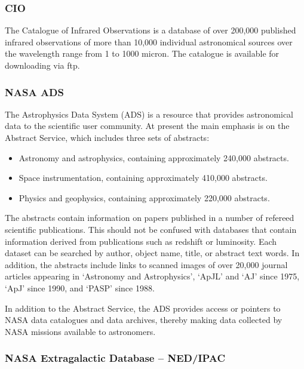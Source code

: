 \documentclass[twoside,11pt]{article}
\newcommand{\htmladdnormallink}[2]{#1}
\newcommand{\xlabel}[1]{}
\newcommand{\NEDref}{\htmladdnormallink{NED}{http://ds.internic.net/cgi-bin/enthtml/database/ned.b}}
\newcommand{\ADSref}{\htmladdnormallink{ADS}{http://adswww.harvard.edu/}}
\begin{document}
\subsubsection{CIO} \xlabel{CIO}
\label{sec:cio}

The Catalogue of Infrared Observations is a database of over 200,000
published infrared observations of more than 10,000 individual astronomical
sources over the wavelength range from 1 to 1000 micron. The catalogue is
available for downloading via ftp.

\subsubsection{NASA {\ADSref}} \xlabel{ADS}
\label{sec:ads}

The Astrophysics Data System ({\ADSref}) is a resource that provides
astronomical data to the scientific user community. At present the main
emphasis is on the Abstract Service, which includes three sets of abstracts:

\begin{itemize}
\item Astronomy and astrophysics, containing approximately 240,000 abstracts.
\item Space instrumentation, containing approximately 410,000 abstracts.
\item Physics and geophysics, containing approximately 220,000 abstracts.
\end{itemize}

The abstracts contain information on papers published in a number of refereed
scientific publications. This should not be confused with databases that contain
information derived from publications such as redshift or luminosity.
Each dataset can be searched by author, object name, title, or abstract text
words. In addition, the abstracts include links to scanned images of over
20,000 journal articles appearing in `Astronomy and Astrophysics',
 `ApJL' and `AJ' since 1975, `ApJ'
since 1990, and `PASP' since 1988.

In addition to the Abstract Service, the {\ADSref} provides access or pointers to
NASA data catalogues and data archives, thereby making data collected by NASA
missions available to astronomers.

\subsubsection{NASA Extragalactic Database -- {\NEDref}/IPAC} \xlabel{NED}
\label{sec:ned}
\end{document}
